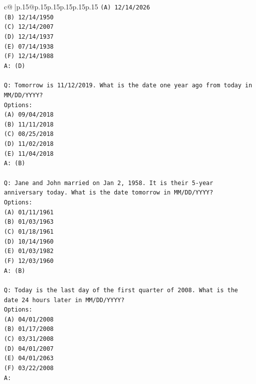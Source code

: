 \documentclass{article}
\begin{document}
{\begin{supertabular}{c@{$\;$}|p{.15\linewidth}@{}p{.15\linewidth}p{.15\linewidth}p{.15\linewidth}p{.15\linewidth}p{.15\linewidth}}
{{{\texttt{(A) 12/14/2026} \\
\texttt{(B) 12/14/1950} \\
\texttt{(C) 12/14/2007} \\
\texttt{(D) 12/14/1937} \\
\texttt{(E) 07/14/1938} \\
\texttt{(F) 12/14/1988} \\
\texttt{A: (D)} \\
\\ 
\texttt{Q: Tomorrow is 11/12/2019. What is the date one year ago from today in MM/DD/YYYY?} \\
\texttt{Options:} \\
\texttt{(A) 09/04/2018} \\
\texttt{(B) 11/11/2018} \\
\texttt{(C) 08/25/2018} \\
\texttt{(D) 11/02/2018} \\
\texttt{(E) 11/04/2018} \\
\texttt{A: (B)} \\
\\ 
\texttt{Q: Jane and John married on Jan 2, 1958. It is their 5{-}year anniversary today. What is the date tomorrow in MM/DD/YYYY?} \\
\texttt{Options:} \\
\texttt{(A) 01/11/1961} \\
\texttt{(B) 01/03/1963} \\
\texttt{(C) 01/18/1961} \\
\texttt{(D) 10/14/1960} \\
\texttt{(E) 01/03/1982} \\
\texttt{(F) 12/03/1960} \\
\texttt{A: (B)} \\
\\ 
\texttt{Q: Today is the last day of the first quarter of 2008. What is the date 24 hours later in MM/DD/YYYY?} \\
\texttt{Options:} \\
\texttt{(A) 04/01/2008} \\
\texttt{(B) 01/17/2008} \\
\texttt{(C) 03/31/2008} \\
\texttt{(D) 04/01/2007} \\
\texttt{(E) 04/01/2063} \\
\texttt{(F) 03/22/2008} \\
\texttt{A:} \\
            }
        }
    }
     \\ \\


\end{supertabular}}
\end{document}
